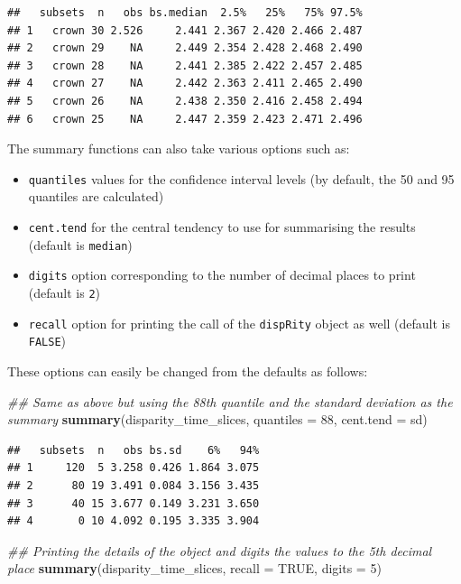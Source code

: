 \documentclass[
]{book}
\newenvironment{Shaded}{\begin{snugshade}}{\end{snugshade}}
\newcommand{\CommentTok}[1]{\textcolor[rgb]{0.56,0.35,0.01}{\textit{#1}}}
\newcommand{\DataTypeTok}[1]{\textcolor[rgb]{0.13,0.29,0.53}{#1}}
\newcommand{\DecValTok}[1]{\textcolor[rgb]{0.00,0.00,0.81}{#1}}
\newcommand{\KeywordTok}[1]{\textcolor[rgb]{0.13,0.29,0.53}{\textbf{#1}}}
\newcommand{\NormalTok}[1]{#1}
\newcommand{\OtherTok}[1]{\textcolor[rgb]{0.56,0.35,0.01}{#1}}
\providecommand{\tightlist}{%
  \setlength{\itemsep}{0pt}\setlength{\parskip}{0pt}}
\begin{document}
\begin{verbatim}
##   subsets  n   obs bs.median  2.5%   25%   75% 97.5%
## 1   crown 30 2.526     2.441 2.367 2.420 2.466 2.487
## 2   crown 29    NA     2.449 2.354 2.428 2.468 2.490
## 3   crown 28    NA     2.441 2.385 2.422 2.457 2.485
## 4   crown 27    NA     2.442 2.363 2.411 2.465 2.490
## 5   crown 26    NA     2.438 2.350 2.416 2.458 2.494
## 6   crown 25    NA     2.447 2.359 2.423 2.471 2.496
\end{verbatim}

The summary functions can also take various options such as:

\begin{itemize}
\tightlist
\item
  \texttt{quantiles} values for the confidence interval levels (by default, the 50 and 95 quantiles are calculated)
\item
  \texttt{cent.tend} for the central tendency to use for summarising the results (default is \texttt{median})
\item
  \texttt{digits} option corresponding to the number of decimal places to print (default is \texttt{2})
\item
  \texttt{recall} option for printing the call of the \texttt{dispRity} object as well (default is \texttt{FALSE})
\end{itemize}

These options can easily be changed from the defaults as follows:

\begin{Shaded}
\begin{Highlighting}[]
\CommentTok{\#\# Same as above but using the 88th quantile and the standard deviation as the summary }
\KeywordTok{summary}\NormalTok{(disparity\_time\_slices, }\DataTypeTok{quantiles =} \DecValTok{88}\NormalTok{, }\DataTypeTok{cent.tend =}\NormalTok{ sd)}
\end{Highlighting}
\end{Shaded}

\begin{verbatim}
##   subsets  n   obs bs.sd    6%   94%
## 1     120  5 3.258 0.426 1.864 3.075
## 2      80 19 3.491 0.084 3.156 3.435
## 3      40 15 3.677 0.149 3.231 3.650
## 4       0 10 4.092 0.195 3.335 3.904
\end{verbatim}

\begin{Shaded}
\begin{Highlighting}[]
\CommentTok{\#\# Printing the details of the object and digits the values to the 5th decimal place}
\KeywordTok{summary}\NormalTok{(disparity\_time\_slices, }\DataTypeTok{recall =} \OtherTok{TRUE}\NormalTok{, }\DataTypeTok{digits =} \DecValTok{5}\NormalTok{)}
\end{Highlighting}
\end{Shaded}
\end{document}
